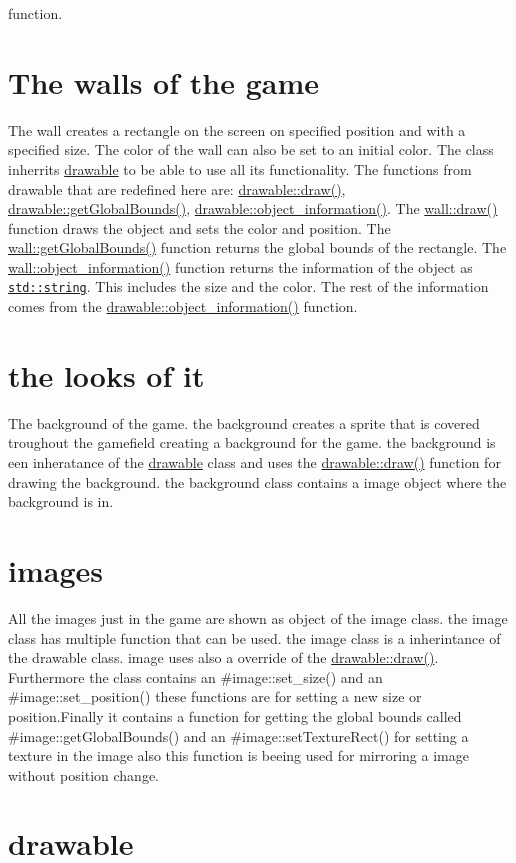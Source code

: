 function.\hypertarget{index_wall}{}\section{The walls of the game}\label{index_wall}
The wall creates a rectangle on the screen on specified position and with a specified size. The color of the wall can also be set to an initial color. The class inherrits \hyperlink{classdrawable}{drawable} to be able to use all its functionality. The functions from drawable that are redefined here are\+: \hyperlink{classdrawable_a4e49e2c1121704c83ce24c5f48dd910f}{drawable\+::draw()}, \hyperlink{classdrawable_ae013ac0be47538be9ce885d6642daf73}{drawable\+::get\+Global\+Bounds()}, \hyperlink{classdrawable_a2ed0f8bb53f33477f7722efa7bb24583}{drawable\+::object\+\_\+information()}. The \hyperlink{classwall_aa25b8377e1d9a209fabd2271294f05d0}{wall\+::draw()} function draws the object and sets the color and position. The \hyperlink{classwall_a317a464c879cfdf9464bd6f1b62d9101}{wall\+::get\+Global\+Bounds()} function returns the global bounds of the rectangle. The \hyperlink{classwall_aab1de4f144f176b134a967ba08747932}{wall\+::object\+\_\+information()} function returns the information of the object as \href{http://www.cplusplus.com/reference/string/string/string/}{\tt std\+::string}. This includes the size and the color. The rest of the information comes from the \hyperlink{classdrawable_a2ed0f8bb53f33477f7722efa7bb24583}{drawable\+::object\+\_\+information()} function.\hypertarget{index_background}{}\section{the looks of it}\label{index_background}
The background of the game. the background creates a sprite that is covered troughout the gamefield creating a background for the game. the background is een inheratance of the \hyperlink{classdrawable}{drawable} class and uses the \hyperlink{classdrawable_a4e49e2c1121704c83ce24c5f48dd910f}{drawable\+::draw()} function for drawing the background. the background class contains a image object where the background is in.\hypertarget{index_images}{}\section{images}\label{index_images}
All the images just in the game are shown as object of the image class. the image class has multiple function that can be used. the image class is a inherintance of the drawable class. image uses also a override of the \hyperlink{classdrawable_a4e49e2c1121704c83ce24c5f48dd910f}{drawable\+::draw()}. Furthermore the class contains an \#image\+::set\+\_\+size() and an \#image\+::set\+\_\+position() these functions are for setting a new size or position.\+Finally it contains a function for getting the global bounds called \#image\+::get\+Global\+Bounds() and an \#image\+::set\+Texture\+Rect() for setting a texture in the image also this function is beeing used for mirroring a image without position change.\hypertarget{index_drawable}{}\section{drawable}\label{index_drawable}
